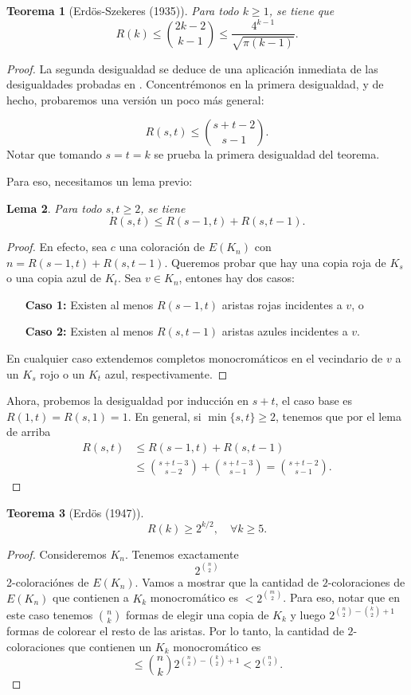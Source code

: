 \documentclass[12pt]{report}
\theoremstyle{plain}
\newtheorem{theorem}{Teorema}[section]
\newtheorem{lemma}[theorem]{Lema}
\theoremstyle{definition}
\begin{document}
\begin{theorem}[Erdös-Szekeres (1935)]
Para todo $k \geq 1$, se tiene que
\[
    R(k) \leq \binom{2k-2}{k-1} \leq \frac{4^{k-1}}{\sqrt {\pi (k-1)}}.
\]
\end{theorem}
\begin{proof}
La segunda desigualdad se deduce de una aplicación inmediata de las desigualdades probadas en \cite{herbertRobbins1955}. Concentrémonos en la primera desigualdad, y de hecho, probaremos una versión un poco más general:

\[
    R(s,t) \leq \binom{s + t - 2}{s-1}.
\]
Notar que tomando $s = t = k$ se prueba la primera desigualdad del teorema.

Para eso, necesitamos un lema previo:
\begin{lemma}
Para todo $s,t \geq 2$, se tiene
\[
    R(s,t) \leq R(s-1, t) + R(s,t-1).
\]
\end{lemma}
\begin{proof}
En efecto, sea $c$ una coloración de $E(K_n)$ con $n = R(s-1,t) + R(s,t-1)$. Queremos probar que hay una copia roja de $K_s$ o una copia azul de $K_t$. Sea $v \in K_n$, entones hay dos casos:
\begin{enumerate}
\item[\textbf{Caso 1:}] Existen al menos $R(s-1,t)$ aristas rojas incidentes a $v$, o
\item[\textbf{Caso 2:}] Existen al menos $R(s,t-1)$ aristas azules incidentes a $v$.
\end{enumerate}
En cualquier caso extendemos completos monocromáticos en el vecindario de $v$ a un $K_s$ rojo o un $K_t$ azul, respectivamente.
\end{proof}

Ahora, probemos la desigualdad por inducción en $s+t$, el caso base es $R (1,t) = R(s,1) = 1$. En general, si $\min \{s,t\} \geq 2$, tenemos que por el lema de arriba
\begin{align*}
    R(s,t) &\leq R(s-1,t) + R(s,t-1) \\
        &\leq  \binom{s + t -3}{s-2} + \binom{s+t-3}{s-1} = \binom { s+ t -2 }{s-1}.
\end{align*}

\end{proof}



\begin{theorem}[Erdös (1947)]
\[
    R(k)  \geq 2^{k/2}, \quad \forall k \geq 5.
\]

\end{theorem}
\begin{proof}
Consideremos $K_n$. Tenemos exactamente
\[
    2^{\binom n 2}
\]
2-coloraciónes de $E(K_n)$. Vamos a mostrar que la cantidad de $2$-coloraciones de $E(K_n)$ que contienen a $K_k$ monocromático es $< 2^{\binom m 2}$. Para eso, notar que en este caso tenemos $\binom n k$ formas de elegir una copia de $K_k$ y luego $2^{\binom n 2 - \binom k 2 + 1}$ formas de colorear el resto de las aristas. Por lo tanto, la cantidad de $2$-coloraciones que contienen un $K_k$ monocromático es
\[
    \leq \binom n k 2^{\binom n 2 - \binom k 2 + 1} < 2^{\binom n 2}.
\]
\end{proof}
\end{document}

